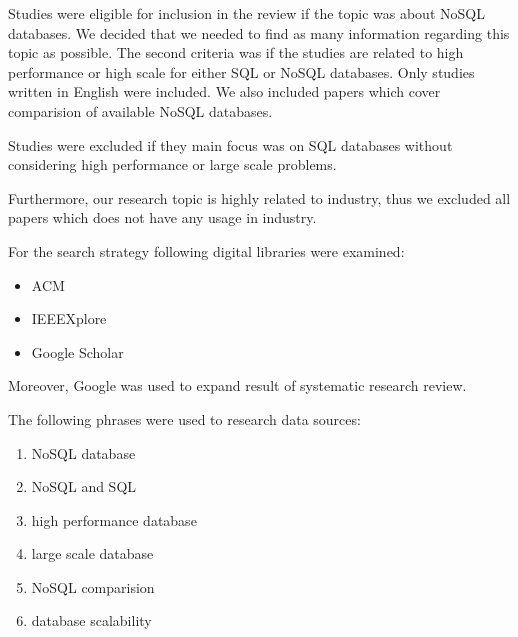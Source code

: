 \documentclass[times, 10pt,twocolumn]{article}
\begin{document}

Studies were eligible for inclusion in the review if the topic was about NoSQL databases. We decided that we needed to find as many information regarding this topic as possible.
The second criteria was if the studies are related to high performance or high scale for either SQL or NoSQL databases. Only studies written in English were included.
We also included papers which cover comparision of available NoSQL databases.

Studies were excluded if they main focus was on SQL databases without considering high performance or large scale problems. 


Furthermore, our research topic is highly related to industry, thus we excluded all papers which does not have any usage in industry.


For the search strategy following digital libraries were examined:
\begin{itemize}
	\item ACM
	\item IEEEXplore
	\item Google Scholar
\end{itemize}

Moreover, Google was used to expand result of systematic research review.

The following phrases were used to research data sources:
\begin{enumerate}
    \item NoSQL database 
	\item NoSQL and SQL
	\item high performance database
	\item large scale database
	\item NoSQL comparision
	\item database scalability
\end{enumerate}

\end{document}
